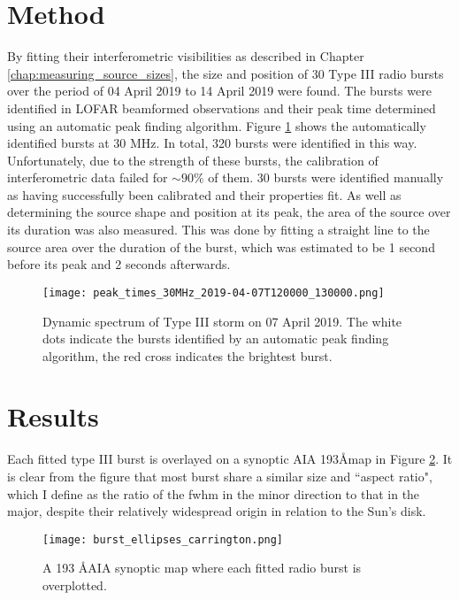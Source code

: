 \section{Method}
\label{sec:obsvtheory_method}
By fitting their interferometric visibilities as described in Chapter \ref{chap:measuring_source_sizes}, the size and position of 30 Type III radio bursts over the period of 04 April 2019 to 14 April 2019 were found. The bursts were identified in LOFAR beamformed observations and their peak time determined using an automatic peak finding algorithm. Figure \ref{fig:dynamic_spectrum_070419} shows the automatically identified bursts at 30 MHz. In total, 320 bursts were identified in this way. Unfortunately, due to the strength of these bursts, the calibration of interferometric data failed for $\sim 90 \%$ of them. 30 bursts were identified manually as having successfully been calibrated and their properties fit. As well as determining the source shape and position at its peak, the area of the source over its duration was also measured. This was done by fitting a straight line to the source area over the duration of the burst, which was estimated to be 1 second before its peak and 2 seconds afterwards.

\begin{figure}
\centering
\texttt{[image: peak\_times\_30MHz\_2019-04-07T120000\_130000.png]}
\caption[Dynamic spectrum of Type III storm on 07 April 2019.]{Dynamic spectrum of Type III storm on 07 April 2019. The white dots indicate the bursts identified by an automatic peak finding algorithm, the red cross indicates the brightest burst.}
\label{fig:dynamic_spectrum_070419}
\end{figure}

\section{Results}
\label{sec:obsvtheory_results}
Each fitted type III burst is overlayed on a synoptic AIA 193\AA  map in Figure \ref{fig:synoptic_bursts}. It is clear from the figure that most burst share a similar size and ``aspect ratio", which I define as the ratio of the fwhm in the minor direction to that in the major, despite their relatively widespread origin in relation to the Sun's disk.

\begin{figure}
\centering
\texttt{[image: burst\_ellipses\_carrington.png]}
\caption[Synoptic AIA 193\AA  map overlayed with Type III radio bursts.]{A 193 \AA  AIA synoptic map where each fitted radio burst is overplotted. }
\label{fig:synoptic_bursts}
\end{figure}


